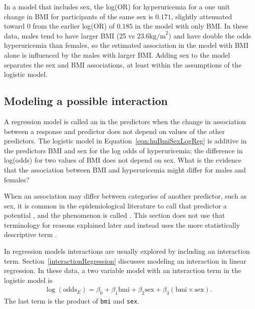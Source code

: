 In a model that includes sex, the log(OR) for hyperuricemia for a one unit change in BMI for participants of the same sex is $0.171$, slightly attenuated toward 0 from the earlier log(OR) of $0.185$ in the model with only BMI. In these data, males tend to have larger BMI (25 vs 23.6$\text{kg/m}^2$) and have double the odds hyperuricemia than females, so the estimated association in the model with BMI alone is influenced by the males with larger BMI.  Adding sex to the model separates the sex and BMI associations, at least within the assumptions of the logistic model.



\subsection{Modeling a possible interaction}
\label{section:interactionLogisticRegression}

A regression model is called an  in the predictors when the change in association between a response and predictor does not depend on values of the other predictors. The logistic model in Equation~\ref{eqn:huBmiSexLogReg} is additive in the predictors BMI and sex for the log odds of hyperuricemia; the difference in log(odds) for two values of BMI does not depend on sex. What is the evidence that the association between BMI and hyperuricemia might differ for males and females?

When an association may differ between categories of another predictor, such as sex, it is common in the epidemiological literature to call that predictor a potential , and the phenomenon is called .  This section does not use that terminology for reasons explained later and instead uses the more statistically descriptive term .

In regression models interactions are usually explored by including an interaction term.  Section~\ref{interactionRegression} discusses modeling an interaction in linear regression.  In these data, a two variable model with an interaction term in the logistic model is
\begin{align}
  \log(\text{odds}_E) = \beta_0 + \beta_1 \text{bmi}
       + \beta_2 \text{sex} + \beta_3 (\text{bmi}\times\text{sex}).
       \label{eqn:huBmiSexInteraction}
\end{align}
The last term is the product of \texttt{bmi} and \texttt{sex}.

